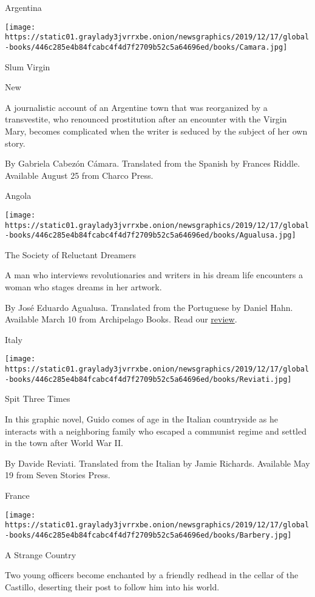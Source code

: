 Argentina

\texttt{[image: https://static01.graylady3jvrrxbe.onion/newsgraphics/2019/12/17/global-books/446c285e4b84fcabc4f4d7f2709b52c5a64696ed/books/Camara.jpg]}

Slum Virgin

New

A journalistic account of an Argentine town that was reorganized by a
transvestite, who renounced prostitution after an encounter with the
Virgin Mary, becomes complicated when the writer is seduced by the
subject of her own story.

 By Gabriela Cabezón Cámara. Translated from the Spanish by Frances
Riddle. Available August 25 from Charco Press.

Angola

\texttt{[image: https://static01.graylady3jvrrxbe.onion/newsgraphics/2019/12/17/global-books/446c285e4b84fcabc4f4d7f2709b52c5a64696ed/books/Agualusa.jpg]}

The Society of Reluctant Dreamers

A man who interviews revolutionaries and writers in his dream life
encounters a woman who stages dreams in her artwork.

 By José Eduardo Agualusa. Translated from the Portuguese by Daniel
Hahn. Available March 10 from Archipelago Books. Read our
\href{https://www.nytimes3xbfgragh.onion/2019/03/11/books/review-arturos-island-elsa-morante-ann-goldstein.html}{review}.

Italy

\texttt{[image: https://static01.graylady3jvrrxbe.onion/newsgraphics/2019/12/17/global-books/446c285e4b84fcabc4f4d7f2709b52c5a64696ed/books/Reviati.jpg]}

Spit Three Times

In this graphic novel, Guido comes of age in the Italian countryside as
he interacts with a neighboring family who escaped a communist regime
and settled in the town after World War II.

 By Davide Reviati. Translated from the Italian by Jamie Richards.
Available May 19 from Seven Stories Press.

France

\texttt{[image: https://static01.graylady3jvrrxbe.onion/newsgraphics/2019/12/17/global-books/446c285e4b84fcabc4f4d7f2709b52c5a64696ed/books/Barbery.jpg]}

A Strange Country

Two young officers become enchanted by a friendly redhead in the cellar
of the Castillo, deserting their post to follow him into his world.

